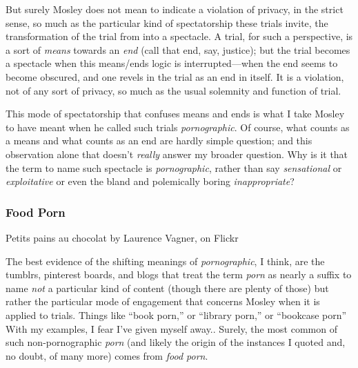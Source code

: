 \documentclass[
  12pt,
]{article}
\begin{document}
But surely Mosley does not mean to indicate a violation of privacy, in
the strict sense, so much as the particular kind of spectatorship these
trials invite, the transformation of the trial from into a spectacle. A
trial, for such a perspective, is a sort of \emph{means} towards an
\emph{end} (call that end, say, justice); but the trial becomes a
spectacle when this means/ends logic is interrupted---when the end seems
to become obscured, and one revels in the trial as an end in itself. It
is a violation, not of any sort of privacy, so much as the usual
solemnity and function of trial.

This mode of spectatorship that confuses means and ends is what I take
Mosley to have meant when he called such trials \emph{pornographic}. Of
course, what counts as a means and what counts as an end are hardly
simple question; and this observation alone that doesn't \emph{really}
answer my broader question. Why is it that the term to name such
spectacle is \emph{pornographic}, rather than say \emph{sensational} or
\emph{exploitative} or even the bland and polemically boring
\emph{inappropriate}?

\hypertarget{food-porn}{%
\subsubsection{Food Porn}\label{food-porn}}

Petits pains au chocolat by Laurence Vagner, on Flickr

The best evidence of the shifting meanings of \emph{pornographic}, I
think, are the tumblrs, pinterest boards, and blogs that treat the term
\emph{porn} as nearly a suffix to name \emph{not} a particular kind of
content (though there are plenty of those) but rather the particular
mode of engagement that concerns Mosley when it is applied to trials.
Things like ``book porn,'' or ``library porn,'' or ``bookcase porn''
{With my examples, I fear I've given myself away.}. Surely, the most
common of such non-pornographic \emph{porn} (and likely the origin of
the instances I quoted and, no doubt, of many more) comes from
\emph{food porn}.
\end{document}
